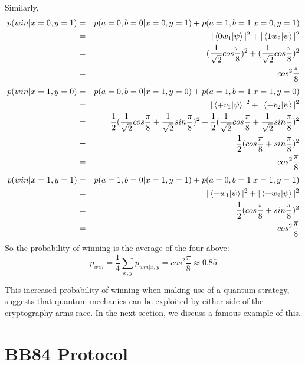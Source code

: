 Similarly,
\begin{eqnarray*}
p(win|x=0,y=1)&=&p(a=0, b=0|x=0, y=1)+p(a=1, b=1|x=0, y=1)\\
&=&|\braket{0 w_1|\psi}|^2 + |\braket{1 w_2|\psi}|^2\\
&=&(\frac{1}{\sqrt{2}}cos\frac{\pi}{8})^2+(\frac{1}{\sqrt{2}}cos\frac{\pi}{8})^2\\
&=&cos^2 \frac{\pi}{8}
\end{eqnarray*}
\begin{eqnarray*}
p(win|x=1,y=0)&=&p(a=0, b=0|x=1, y=0)+p(a=1, b=1|x=1, y=0)\\
&=&|\braket{+ v_1|\psi}|^2 + |\braket{- v_2|\psi}|^2\\
&=&\frac{1}{2}(\frac{1}{\sqrt{2}}cos\frac{\pi}{8}+\frac{1}{\sqrt{2}}sin\frac{\pi}{8})^2+\frac{1}{2}(\frac{1}{\sqrt{2}}cos\frac{\pi}{8}+\frac{1}{\sqrt{2}}sin\frac{\pi}{8})^2\\
&=&\frac{1}{2}(cos\frac{\pi}{8}+sin\frac{\pi}{8})^2\\
&=&cos^2 \frac{\pi}{8}
\end{eqnarray*}
\begin{eqnarray*}
p(win|x=1,y=1)&=&p(a=1, b=0|x=1, y=1)+p(a=0, b=1|x=1, y=1)\\
&=&|\braket{- w_1|\psi}|^2 + |\braket{+ w_2|\psi}|^2\\
&=&\frac{1}{2}(cos\frac{\pi}{8}+sin\frac{\pi}{8})^2\\
&=&cos^2 \frac{\pi}{8}
\end{eqnarray*}
So the probability of winning is the average of the four above:
\begin{equation*}
    p_{win}=\frac{1}{4}\sum_{x,y}p_{win|x,y}=cos^2 \frac{\pi}{8} \approx 0.85
\end{equation*}


This increased probability of winning when making use of a quantum strategy, suggests that quantum mechanics can be exploited by either side of the cryptography arms race.  In the next section, we discuss a famous example of this.




\pagebreak

\section{BB84 Protocol}

